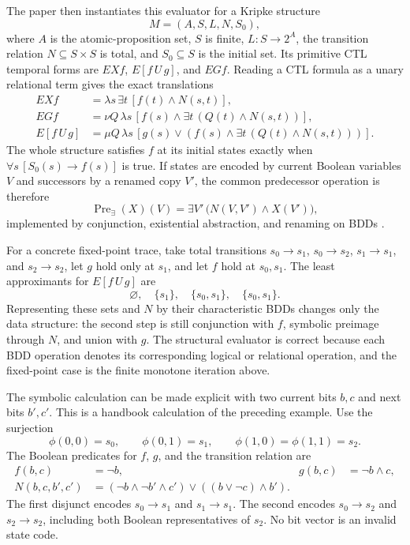 The paper then instantiates this evaluator for a Kripke structure
\[
 M=(A,S,L,N,S_0),
\]
where \(A\) is the atomic-proposition set, \(S\) is finite,
\(L:S\to2^A\), the transition relation \(N\subseteq S\times S\) is total, and
\(S_0\subseteq S\) is the initial set.  Its primitive CTL temporal forms are
\(EXf\), \(E[f\,U\,g]\), and \(EGf\).  Reading a CTL formula as a unary
relational term gives the exact translations
\[
\begin{aligned}
 EXf
  &=\lambda s\,\exists t\,[f(t)\land N(s,t)],\\
 EGf
  &=\nu Q\,\lambda s\,[f(s)\land
       \exists t\,(Q(t)\land N(s,t))],\\
 E[f\,U\,g]
  &=\mu Q\,\lambda s\,[g(s)\lor
       (f(s)\land\exists t\,(Q(t)\land N(s,t)))].
\end{aligned}
\]
The whole structure satisfies \(f\) at its initial states exactly when
\(\forall s\,[S_0(s)\to f(s)]\) is true.  If states are encoded by current
Boolean variables \(V\) and successors by a renamed copy \(V'\), the common
predecessor operation is therefore
\[
 \operatorname{Pre}_{\exists}(X)(V)
 =\exists V'\,\bigl(N(V,V')\land X(V')\bigr),
\]
implemented by conjunction, existential abstraction, and renaming on BDDs
\cite[\S6.1]{BurchEtAl1992}.

For a concrete fixed-point trace, take total transitions
\(s_0\to s_1\), \(s_0\to s_2\), \(s_1\to s_1\), and \(s_2\to s_2\), let
\(g\) hold only at \(s_1\), and let \(f\) hold at \(s_0,s_1\).  The least
approximants for \(E[f\,U\,g]\) are
\[
 \varnothing,
 \quad\{s_1\},
 \quad\{s_0,s_1\},
 \quad\{s_0,s_1\}.
\]
Representing these sets and \(N\) by their characteristic BDDs changes only
the data structure: the second step is still conjunction with \(f\), symbolic
preimage through \(N\), and union with \(g\).  The structural evaluator is
correct because each BDD operation denotes its corresponding logical or
relational operation, and the fixed-point case is the finite monotone iteration
above.

The symbolic calculation can be made explicit with two current bits \(b,c\)
and next bits \(b',c'\). This is a handbook calculation of the preceding
example. Use the surjection
\[
 \phi(0,0)=s_0,\qquad
 \phi(0,1)=s_1,\qquad
 \phi(1,0)=\phi(1,1)=s_2.
\]
The Boolean predicates for \(f\), \(g\), and the transition relation are
\[
\begin{aligned}
 f(b,c)&=\neg b,& g(b,c)&=\neg b\land c,\\
 N(b,c,b',c')
  &=(\neg b\land\neg b'\land c')
      \lor((b\lor\neg c)\land b').
\end{aligned}
\]
The first disjunct encodes \(s_0\to s_1\) and \(s_1\to s_1\).
The second encodes \(s_0\to s_2\) and \(s_2\to s_2\), including both Boolean
representatives of \(s_2\). No bit vector is an invalid state code.

